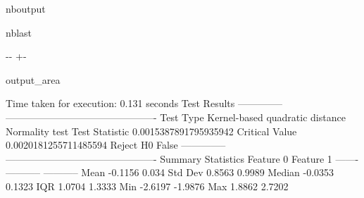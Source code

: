 \documentclass[letterpaper,10pt,english,openany,oneside]{sphinxmanual}
\begin{document}
\begin{sphinxuseclass}{nboutput}
\begin{sphinxuseclass}{nblast}
{

\kern-\sphinxverbatimsmallskipamount\kern-\baselineskip
\kern+\FrameHeightAdjust\kern-\fboxrule
\vspace{\nbsphinxcodecellspacing}

\begin{sphinxuseclass}{output_area}
\begin{sphinxuseclass}{}


\begin{sphinxVerbatim}[commandchars=\\\{\}]
Time taken for execution: 0.131 seconds
Test Results
--------------  ----------------------------------------------
Test Type       Kernel-based quadratic distance Normality test
Test Statistic  0.0015387891795935942
Critical Value  0.0020181255711485594
Reject H0       False
--------------  ----------------------------------------------
Summary Statistics
           Feature 0    Feature 1
-------  -----------  -----------
Mean         -0.1156       0.034
Std Dev       0.8563       0.9989
Median       -0.0353       0.1323
IQR           1.0704       1.3333
Min          -2.6197      -1.9876
Max           1.8862       2.7202
\end{sphinxVerbatim}



\end{sphinxuseclass}
\end{sphinxuseclass}
}

\end{sphinxuseclass}
\end{sphinxuseclass}
\end{document}
